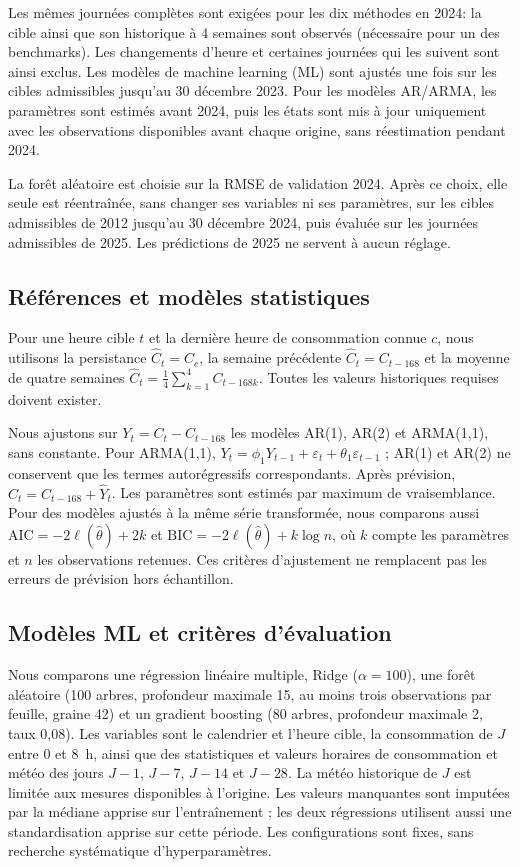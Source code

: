 Les mêmes journées complètes sont exigées pour les dix méthodes en 2024: la cible ainsi que son historique à 4 semaines sont observés (nécessaire pour un des benchmarks). Les changements d'heure et certaines journées qui les suivent sont ainsi exclus. Les modèles de machine learning (ML) sont ajustés une fois sur les cibles admissibles jusqu'au 30 décembre 2023. Pour les modèles AR/ARMA, les paramètres sont estimés avant 2024, puis les états sont mis à jour uniquement avec les observations disponibles avant chaque origine, sans réestimation pendant 2024.

La forêt aléatoire est choisie sur la RMSE de validation 2024. Après ce choix, elle seule est réentraînée, sans changer ses variables ni ses paramètres, sur les cibles admissibles de 2012 jusqu'au 30 décembre 2024, puis évaluée sur les journées admissibles de 2025. Les prédictions de 2025 ne servent à aucun réglage.

\subsection{Références et modèles statistiques}
Pour une heure cible $t$ et la dernière heure de consommation connue $c$, nous utilisons la persistance $\widehat C_t=C_c$, la semaine précédente $\widehat C_t=C_{t-168}$ et la moyenne de quatre semaines $\widehat C_t=\frac14\sum_{k=1}^{4}C_{t-168k}$. Toutes les valeurs historiques requises doivent exister.

Nous ajustons sur $Y_t=C_t-C_{t-168}$ les modèles AR(1), AR(2) et ARMA(1,1), sans constante. Pour ARMA(1,1), $Y_t=\phi_1Y_{t-1}+\varepsilon_t+\theta_1\varepsilon_{t-1}$ ; AR(1) et AR(2) ne conservent que les termes autorégressifs correspondants. Après prévision, $\widehat C_t=C_{t-168}+\widehat Y_t$. Les paramètres sont estimés par maximum de vraisemblance. Pour des modèles ajustés à la même série transformée, nous comparons aussi $\mathrm{AIC}=-2\ell(\widehat\theta)+2k$ et $\mathrm{BIC}=-2\ell(\widehat\theta)+k\log n$, où $k$ compte les paramètres et $n$ les observations retenues. Ces critères d'ajustement ne remplacent pas les erreurs de prévision hors échantillon.

\subsection{Modèles ML et critères d'évaluation}
Nous comparons une régression linéaire multiple, Ridge ($\alpha=100$), une forêt aléatoire (100 arbres, profondeur maximale 15, au moins trois observations par feuille, graine 42) et un gradient boosting (80 arbres, profondeur maximale 2, taux 0,08). Les variables sont le calendrier et l'heure cible, la consommation de $J$ entre 0 et 8~h, ainsi que des statistiques et valeurs horaires de consommation et météo des jours $J-1$, $J-7$, $J-14$ et $J-28$. La météo historique de $J$ est limitée aux mesures disponibles à l'origine. Les valeurs manquantes sont imputées par la médiane apprise sur l'entraînement ; les deux régressions utilisent aussi une standardisation apprise sur cette période. Les configurations sont fixes, sans recherche systématique d'hyperparamètres.

